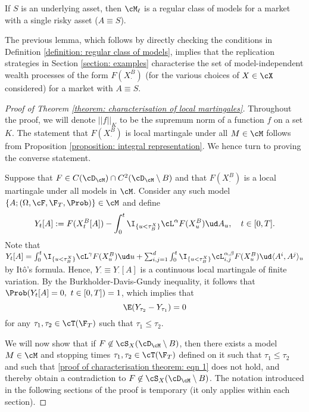 \documentclass[11pt]{article}
\begin{document}
\begin{lemma}
\label{lemma: regular class of models}
If $S$ is an underlying asset, then $\cM_{\ell}$ is a regular class of models for a market with a single risky asset ($A \equiv S$).
\end{lemma}

The previous lemma, which follows by directly checking the conditions in Definition \ref{definition: regular class of models}, implies that the replication strategies in Section \ref{section: examples} characterise the set of model-independent wealth processes of the form $F(X^B_\cdot)$ (for the various choices of $X \in \cX$ considered) for a market with $A \equiv S$.

\begin{proof}[Proof of Theorem \ref{theorem: characterisation of local martingales}]

Throughout the proof, we will denote $||f||_K$ to be the supremum norm of a function $f$ on a set $K$. The statement that $F(X^B_\cdot)$ is local martingale under all $M \in \cM$ follows from Proposition \ref{proposition: integral representation}. We hence turn to proving the converse statement.

Suppose that $F \in C(\cD_\cM) \cap C^2(\cD_\cM \setminus B)$ and that $F(X^B_\cdot)$ is a local martingale under all models in $\cM$. Consider any such model $\{ A; (\Omega, \cF, \F_T, \Prob) \} \in \cM$ and define
$$
Y_t[A] := F(X^B_t[A]) - \int_0^t \I_{\{ u < \tau^X_B \}} \cL^\alpha F(X^B_u) \ud A_u, \quad t \in [0,T].
$$
Note that $Y_t[A] = \int_0^t \I_{\{ u < \tau^X_B \}} \cL^\gamma F(X^B_u) \ud u + \sum_{i,j=1}^d \int_0^t \I_{\{ u < \tau^X_B \}} \cL^{\alpha, \beta}_{i,j} F(X^B_u) \ud \langle A^i, A^j \rangle_u$ by It\^o's formula. Hence, $Y_\cdot \equiv Y_\cdot[A]$ is a continuous local martingale of finite variation. By the Burkholder-Davis-Gundy inequality, it follows that $
\Prob( Y_t[A] = 0, \ t \in [0,T] ) = 1$, which implies that
\begin{equation}
\label{proof of characterisation theorem: eqn 1}
\E( Y_{\tau_2} - Y_{\tau_1} ) = 0
\end{equation}
for any $\tau_1, \tau_2 \in \cT(\F_T)$ such that $\tau_1 \leq \tau_2$.

We will now show that if $F \not\in \cS_X(\cD_\cM \setminus B)$, then there exists a model $M \in \cM$ and stopping times $\tau_1, \tau_2 \in \cT(\F_T)$ defined on it such that $\tau_1 \leq \tau_2$ and such that \eqref{proof of characterisation theorem: eqn 1} does not hold, and thereby obtain a contradiction to $F \not\in \cS_X(\cD_\cM \setminus B)$. The notation introduced in the following sections of the proof is temporary (it  only applies within each section).


\end{proof}
\end{document}
